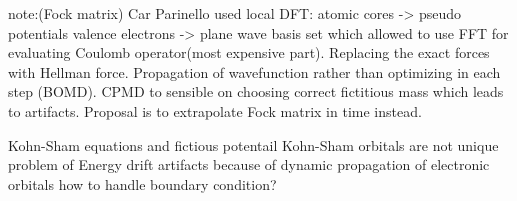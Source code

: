 \documentclass[12pt]{scrartcl}
\begin{document}
note:(Fock matrix)
Car Parinello used local DFT: atomic cores -> pseudo potentials
							  valence electrons -> plane wave basis set
which allowed to use FFT for evaluating Coulomb operator(most expensive part). Replacing the exact forces with Hellman force.  Propagation of wavefunction rather than optimizing in each step (BOMD). CPMD to sensible on choosing correct fictitious mass which leads to artifacts. Proposal is to extrapolate Fock matrix in time instead.




Kohn-Sham equations and fictious potentail
Kohn-Sham orbitals are not unique
problem of Energy drift
artifacts because of dynamic propagation of electronic orbitals
how to handle boundary condition?


\newpage


\end{document}
